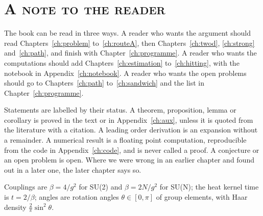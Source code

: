 \documentclass[11pt,twoside,openany]{book}
\theoremstyle{plainsc}
\theoremstyle{defsc}
\begin{document}
\cleardoublepage
\pagestyle{fancy}
\tableofcontents



\clearpage
\thispagestyle{plain}
\section*{\normalfont\large\scshape A note to the reader}
The book can be read in three ways. A reader who wants the argument should read Chapters~\ref{ch:problem} to~\ref{ch:routeA}, then Chapters~\ref{ch:twod}, \ref{ch:strong} and~\ref{ch:path}, and finish with Chapter~\ref{ch:programme}. A reader who wants the computations should add Chapters~\ref{ch:estimation} to~\ref{ch:hitting}, with the notebook in Appendix~\ref{ch:notebook}. A reader who wants the open problems should go to Chapters~\ref{ch:path} to~\ref{ch:sandwich} and the list in Chapter~\ref{ch:programme}.

Statements are labelled by their status. A theorem, proposition, lemma or corollary is proved in the text or in Appendix~\ref{ch:aux}, unless it is quoted from the literature with a citation. A leading order derivation is an expansion without a remainder. A numerical result is a floating point computation, reproducible from the code in Appendix~\ref{ch:code}, and is never called a proof. A conjecture or an open problem is open. Where we were wrong in an earlier chapter and found out in a later one, the later chapter says so.

Couplings are $\beta=4/g^2$ for SU(2) and $\beta=2N/g^2$ for SU(N); the heat kernel time is $t=2/\beta$; angles are rotation angles $\theta\in[0,\pi]$ of group elements, with Haar density $\frac2\pi\sin^2\theta$.

\clearpage
\thispagestyle{plain}
\end{document}
